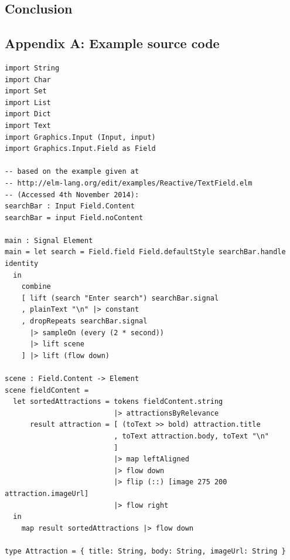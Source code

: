 \documentclass[12pt]{article}
\begin{document}
\section{Conclusion}




\begin{appendices}
\chapter{Appendix A: Example source code}
\label{app:A}
\begin{verbatim}
import String
import Char
import Set
import List
import Dict
import Text
import Graphics.Input (Input, input)
import Graphics.Input.Field as Field

-- based on the example given at 
-- http://elm-lang.org/edit/examples/Reactive/TextField.elm 
-- (Accessed 4th November 2014):
searchBar : Input Field.Content
searchBar = input Field.noContent

main : Signal Element
main = let search = Field.field Field.defaultStyle searchBar.handle identity
  in
    combine
    [ lift (search "Enter search") searchBar.signal
    , plainText "\n" |> constant
    , dropRepeats searchBar.signal 
      |> sampleOn (every (2 * second)) 
      |> lift scene
    ] |> lift (flow down)

scene : Field.Content -> Element
scene fieldContent = 
  let sortedAttractions = tokens fieldContent.string 
                          |> attractionsByRelevance
      result attraction = [ (toText >> bold) attraction.title
                          , toText attraction.body, toText "\n"
                          ] 
                          |> map leftAligned 
                          |> flow down
                          |> flip (::) [image 275 200 attraction.imageUrl]
                          |> flow right
  in 
    map result sortedAttractions |> flow down

type Attraction = { title: String, body: String, imageUrl: String }


\end{verbatim}
\end{appendices}
\end{document}
